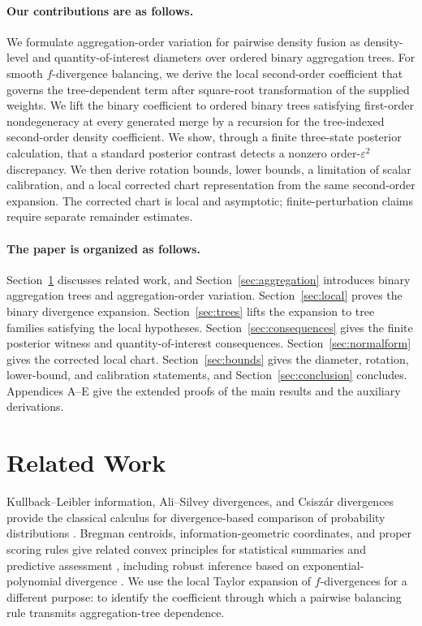 \documentclass[11pt]{article}
\theoremstyle{plain}
\theoremstyle{definition}
\theoremstyle{definition}
\newcommand{\eps}{\varepsilon}
\begin{document}
\paragraph{\textbf{Our contributions are as follows.}} We formulate aggregation-order variation for pairwise density fusion as density-level and quantity-of-interest diameters over ordered binary aggregation trees. For smooth $f$-divergence balancing, we derive the local second-order coefficient that governs the tree-dependent term after square-root transformation of the supplied weights. We lift the binary coefficient to ordered binary trees satisfying first-order nondegeneracy at every generated merge by a recursion for the tree-indexed second-order density coefficient. We show, through a finite three-state posterior calculation, that a standard posterior contrast detects a nonzero order-$\eps^2$ discrepancy. We then derive rotation bounds, lower bounds, a limitation of scalar calibration, and a local corrected chart representation from the same second-order expansion. The corrected chart is local and asymptotic; finite-perturbation claims require separate remainder estimates.


\paragraph{\textbf{The paper is organized as follows.}} Section~\ref{sec:related} discusses related work, and Section~\ref{sec:aggregation} introduces binary aggregation trees and aggregation-order variation. Section~\ref{sec:local} proves the binary divergence expansion. Section~\ref{sec:trees} lifts the expansion to tree families satisfying the local hypotheses. Section~\ref{sec:consequences} gives the finite posterior witness and quantity-of-interest consequences. Section~\ref{sec:normalform} gives the corrected local chart. Section~\ref{sec:bounds} gives the diameter, rotation, lower-bound, and calibration statements, and Section~\ref{sec:conclusion} concludes. Appendices A--E give the extended proofs of the main results and the auxiliary derivations.



\section{Related Work}\label{sec:related}
Kullback--Leibler information, Ali--Silvey divergences, and Csisz\'ar divergences provide the classical calculus for divergence-based comparison of probability distributions \cite{kullback1951information,ali1966general,csiszar1967information}. Bregman centroids, information-geometric coordinates, and proper scoring rules give related convex principles for statistical summaries and predictive assessment \cite{banerjee2005clustering,nielsen2009sided,amari2016information,gneiting2007strictly}, including robust inference based on exponential-polynomial divergence \cite{singh2021robust}. We use the local Taylor expansion of $f$-divergences for a different purpose: to identify the coefficient through which a pairwise balancing rule transmits aggregation-tree dependence.
\end{document}
